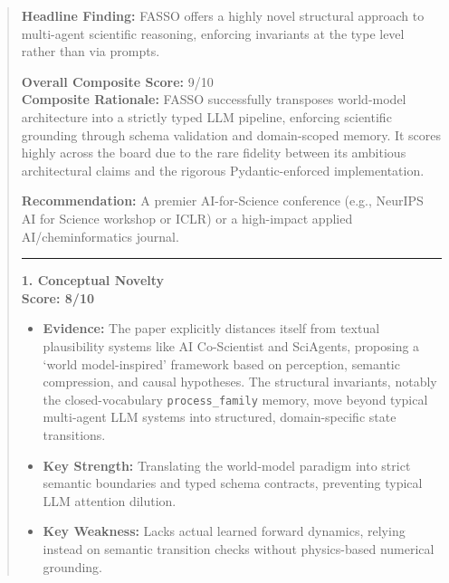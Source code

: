 \documentclass[11pt]{article}
\begin{document}
\begin{quote}
\sffamily\small
\textbf{Headline Finding:} FASSO offers a highly novel structural approach to multi-agent scientific reasoning, enforcing invariants at the type level rather than via prompts.

\textbf{Overall Composite Score:} 9/10  \\
\textbf{Composite Rationale:} FASSO successfully transposes world-model architecture into a strictly typed LLM pipeline, enforcing scientific grounding through schema validation and domain-scoped memory. It scores highly across the board due to the rare fidelity between its ambitious architectural claims and the rigorous Pydantic-enforced implementation.

\textbf{Recommendation:} A premier AI-for-Science conference (e.g., NeurIPS AI for Science workshop or ICLR) or a high-impact applied AI/cheminformatics journal.

\vspace{1em}
\hrule
\vspace{1em}

\textbf{1. Conceptual Novelty} \\
\textbf{Score: 8/10}
\begin{itemize}[leftmargin=*,noitemsep]
\item \textbf{Evidence:} The paper explicitly distances itself from textual plausibility systems like AI Co-Scientist and SciAgents, proposing a `world model-inspired' framework based on perception, semantic compression, and causal hypotheses. The structural invariants, notably the closed-vocabulary \texttt{process\_family} memory, move beyond typical multi-agent LLM systems into structured, domain-specific state transitions.
\item \textbf{Key Strength:} Translating the world-model paradigm into strict semantic boundaries and typed schema contracts, preventing typical LLM attention dilution.
\item \textbf{Key Weakness:} Lacks actual learned forward dynamics, relying instead on semantic transition checks without physics-based numerical grounding.
\end{itemize}


\end{quote}
\end{document}
